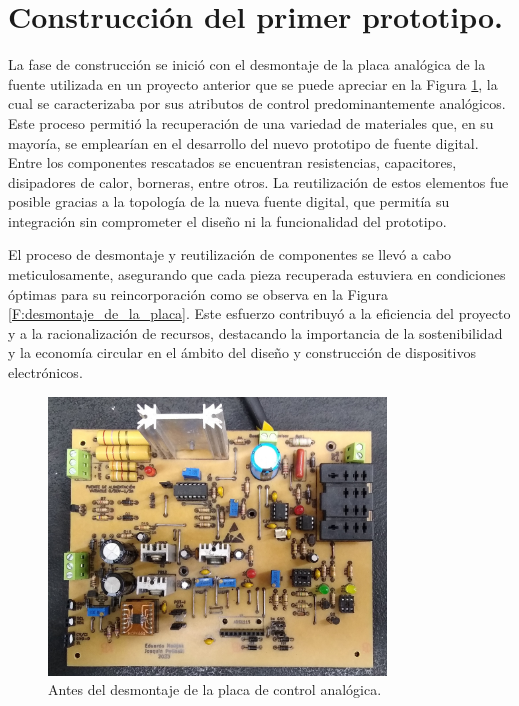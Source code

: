 \section{Construcción del primer prototipo.}
La fase de construcción se inició con el desmontaje de la placa analógica de la fuente utilizada en un proyecto anterior que se puede apreciar en la Figura \ref{F:placa_original}, la cual se caracterizaba por sus atributos de control predominantemente analógicos. Este proceso permitió la recuperación de una variedad de materiales que, en su mayoría, se emplearían en el desarrollo del nuevo prototipo de fuente digital. Entre los componentes rescatados se encuentran resistencias, capacitores, disipadores de calor, borneras, entre otros. La reutilización de estos elementos fue posible gracias a la topología de la nueva fuente digital, que permitía su integración sin comprometer el diseño ni la funcionalidad del prototipo.  \par 
El proceso de desmontaje y reutilización de componentes se llevó a cabo meticulosamente, asegurando que cada pieza recuperada estuviera en condiciones óptimas para su reincorporación como se observa en la Figura \ref{F:desmontaje_de_la_placa}. Este esfuerzo contribuyó a la eficiencia del proyecto y a la racionalización de recursos, destacando la importancia de la sostenibilidad y la economía circular en el ámbito del diseño y construcción de dispositivos electrónicos.
\begin{figure}[H]
    \centering
    \includegraphics[width=0.8\textwidth]{./imagenes/fotos/placa_original.jpg}
    \caption{Antes del desmontaje de la placa de control analógica.}
    \label{F:placa_original}
\end{figure}

